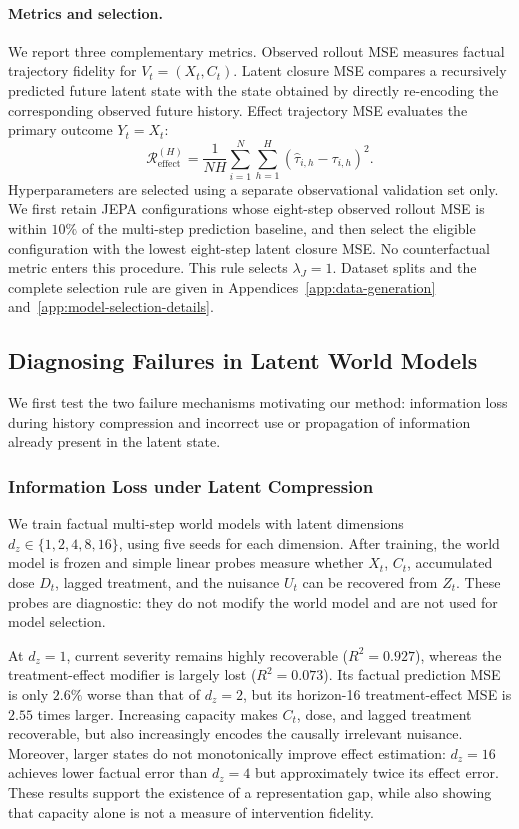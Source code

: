 \paragraph{Metrics and selection.}
We report three complementary metrics. Observed rollout MSE measures
factual trajectory fidelity for $V_t=(X_t,C_t)$. Latent closure MSE
compares a recursively predicted future latent state with the state
obtained by directly re-encoding the corresponding observed future
history. Effect trajectory MSE evaluates the primary outcome $Y_t=X_t$:
\begin{equation}
    \mathcal R_{\mathrm{effect}}^{(H)}
    =
    \frac{1}{NH}
    \sum_{i=1}^{N}\sum_{h=1}^{H}
    \left(\widehat\tau_{i,h}-\tau_{i,h}\right)^2.
\end{equation}
Hyperparameters are selected using a separate observational validation
set only. We first retain JEPA configurations whose eight-step observed
rollout MSE is within $10\%$ of the multi-step prediction baseline, and
then select the eligible configuration with the lowest eight-step latent
closure MSE. No counterfactual metric enters this procedure. This rule
selects $\lambda_J=1$. Dataset splits and the complete selection rule are
given in Appendices~\ref{app:data-generation}
and~\ref{app:model-selection-details}.

\subsection{Diagnosing Failures in Latent World Models}
\label{sec:latent-diagnosis}

We first test the two failure mechanisms motivating our method:
information loss during history compression and incorrect use or
propagation of information already present in the latent state.

\subsubsection{Information Loss under Latent Compression}

We train factual multi-step world models with latent dimensions
$d_z\in\{1,2,4,8,16\}$, using five seeds for each dimension. After
training, the world model is frozen and simple linear probes measure
whether $X_t$, $C_t$, accumulated dose $D_t$, lagged treatment, and the
nuisance $U_t$ can be recovered from $Z_t$. These probes are diagnostic:
they do not modify the world model and are not used for model selection.

At $d_z=1$, current severity remains highly recoverable
($R^2=0.927$), whereas the treatment-effect modifier is largely lost
($R^2=0.073$). Its factual prediction MSE is only $2.6\%$ worse than
that of $d_z=2$, but its horizon-16 treatment-effect MSE is $2.55$
times larger. Increasing capacity makes $C_t$, dose, and lagged
treatment recoverable, but also increasingly encodes the causally
irrelevant nuisance. Moreover, larger states do not monotonically
improve effect estimation: $d_z=16$ achieves lower factual error than
$d_z=4$ but approximately twice its effect error. These results support
the existence of a representation gap, while also showing that capacity
alone is not a measure of intervention fidelity.

